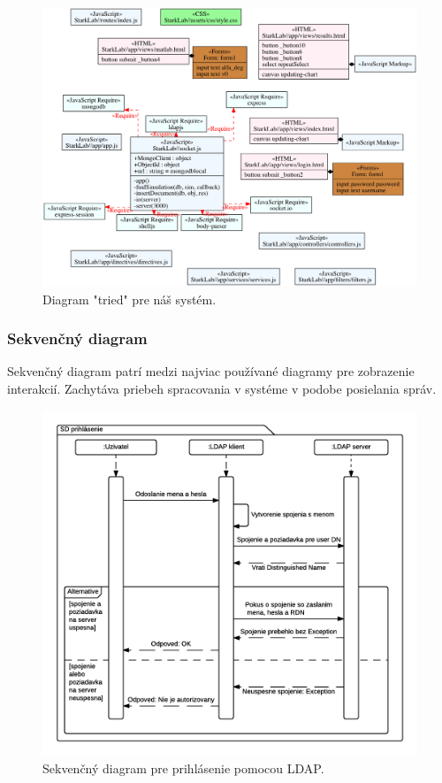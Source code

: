 \begin{figure}[H]
  \centering
  \includegraphics[scale=0.40]{img/diagrams/class.png}
  \caption{Diagram "tried" pre náš systém.}
  \label{img-class-diagram}
\end{figure}

\subsubsection{Sekvenčný diagram}\label{diagram-sequence-section}
Sekvenčný diagram patrí medzi najviac používané diagramy pre zobrazenie interakcií. Zachytáva priebeh spracovania v systéme v podobe posielania správ.

\begin{figure}[H]
  \centering
  \includegraphics[scale=0.7]{img/diagrams/sequence-ldap.png}
  \caption{Sekvenčný diagram pre prihlásenie pomocou LDAP.}
  \label{img-sequence-ldap-login}
\end{figure}

